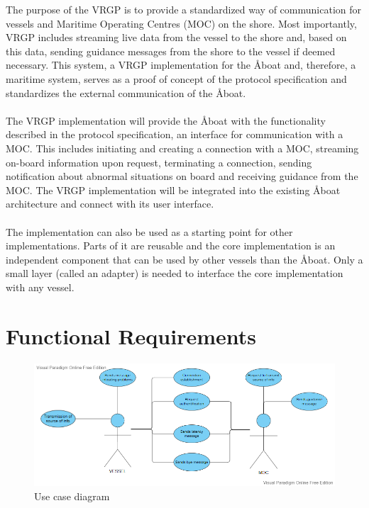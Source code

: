 The purpose of the VRGP is to provide a standardized way of communication for vessels and Maritime Operating Centres (MOC) on the shore. Most importantly, VRGP includes streaming live data from the vessel to the shore and, based on this data, sending guidance messages from the shore to the vessel if deemed necessary. This system, a VRGP implementation for the Åboat and, therefore, a maritime system, serves as a proof of concept of the protocol specification and standardizes the external communication of the Åboat.
\\\\
The VRGP implementation will provide the Åboat with the functionality described in the protocol specification, an interface for communication with a MOC. This includes initiating and creating a connection with a MOC, streaming on-board information upon request, terminating a connection, sending notification about abnormal situations on board and receiving guidance from the MOC. The VRGP implementation will be integrated into the existing Åboat architecture and connect with its user interface.
\\\\
The implementation can also be used as a starting point for other implementations. Parts of it are reusable and the core implementation is an independent component that can be used by other vessels than the Åboat. Only a small layer (called an adapter) is needed to interface the core implementation with any vessel.

\newpage

\section{Functional Requirements}\label{sec:func-requirements}

\begin{figure}[ht]
	\centering
	\includegraphics[width=\linewidth]{diagrams/use-case-diagram}
	\caption{Use case diagram}
	\label{fig:use-case-diagram}
\end{figure}

